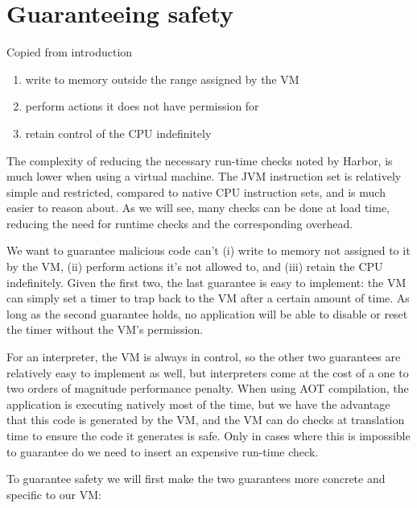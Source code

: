 \chapter{Guaranteeing safety}




Copied from introduction
\begin{enumerate}
	\item write to memory outside the range assigned by the VM
	\item perform actions it does not have permission for
	\item retain control of the CPU indefinitely
\end{enumerate}


The complexity of reducing the necessary run-time checks noted by Harbor, is much lower when using a virtual machine. The JVM instruction set is relatively simple and restricted, compared to native CPU instruction sets, and is much easier to reason about. As we will see, many checks can be done at load time, reducing the need for runtime checks and the corresponding overhead.

We want to guarantee malicious code can't (i) write to memory not assigned to it by the VM, (ii) perform actions it's not allowed to, and (iii) retain the CPU indefinitely. Given the first two, the last guarantee is easy to implement: the VM can simply set a timer to trap back to the VM after a certain amount of time. As long as the second guarantee holds, no application will be able to disable or reset the timer without the VM's permission.

For an interpreter, the VM is always in control, so the other two guarantees are relatively easy to implement as well, but interpreters come at the cost of a one to two orders of magnitude performance penalty. When using AOT compilation, the application is executing natively most of the time, but we have the advantage that this code is generated by the VM, and the VM can do checks at translation time to ensure the code it generates is safe. Only in cases where this is impossible to guarantee do we need to insert an expensive run-time check.

To guarantee safety we will first make the two guarantees more concrete and specific to our VM:

